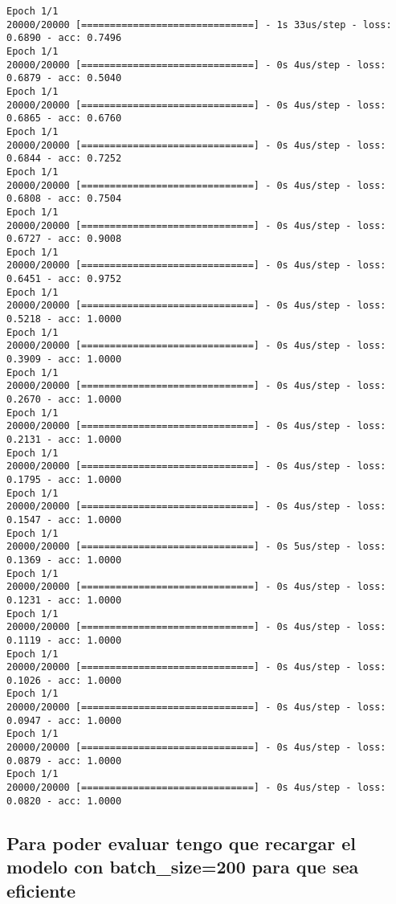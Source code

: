 \documentclass[11pt]{article}
\begin{document}
    \begin{Verbatim}[commandchars=\\\{\}]
Epoch 1/1
20000/20000 [==============================] - 1s 33us/step - loss: 0.6890 - acc: 0.7496
Epoch 1/1
20000/20000 [==============================] - 0s 4us/step - loss: 0.6879 - acc: 0.5040
Epoch 1/1
20000/20000 [==============================] - 0s 4us/step - loss: 0.6865 - acc: 0.6760
Epoch 1/1
20000/20000 [==============================] - 0s 4us/step - loss: 0.6844 - acc: 0.7252
Epoch 1/1
20000/20000 [==============================] - 0s 4us/step - loss: 0.6808 - acc: 0.7504
Epoch 1/1
20000/20000 [==============================] - 0s 4us/step - loss: 0.6727 - acc: 0.9008
Epoch 1/1
20000/20000 [==============================] - 0s 4us/step - loss: 0.6451 - acc: 0.9752
Epoch 1/1
20000/20000 [==============================] - 0s 4us/step - loss: 0.5218 - acc: 1.0000
Epoch 1/1
20000/20000 [==============================] - 0s 4us/step - loss: 0.3909 - acc: 1.0000
Epoch 1/1
20000/20000 [==============================] - 0s 4us/step - loss: 0.2670 - acc: 1.0000
Epoch 1/1
20000/20000 [==============================] - 0s 4us/step - loss: 0.2131 - acc: 1.0000
Epoch 1/1
20000/20000 [==============================] - 0s 4us/step - loss: 0.1795 - acc: 1.0000
Epoch 1/1
20000/20000 [==============================] - 0s 4us/step - loss: 0.1547 - acc: 1.0000
Epoch 1/1
20000/20000 [==============================] - 0s 5us/step - loss: 0.1369 - acc: 1.0000
Epoch 1/1
20000/20000 [==============================] - 0s 4us/step - loss: 0.1231 - acc: 1.0000
Epoch 1/1
20000/20000 [==============================] - 0s 4us/step - loss: 0.1119 - acc: 1.0000
Epoch 1/1
20000/20000 [==============================] - 0s 4us/step - loss: 0.1026 - acc: 1.0000
Epoch 1/1
20000/20000 [==============================] - 0s 4us/step - loss: 0.0947 - acc: 1.0000
Epoch 1/1
20000/20000 [==============================] - 0s 4us/step - loss: 0.0879 - acc: 1.0000
Epoch 1/1
20000/20000 [==============================] - 0s 4us/step - loss: 0.0820 - acc: 1.0000

    \end{Verbatim}

    \hypertarget{para-poder-evaluar-tengo-que-recargar-el-modelo-con-batch_size200-para-que-sea-eficiente}{%
\subsection{Para poder evaluar tengo que recargar el modelo con
batch\_size=200 para que sea
eficiente}\label{para-poder-evaluar-tengo-que-recargar-el-modelo-con-batch_size200-para-que-sea-eficiente}}
\end{document}

